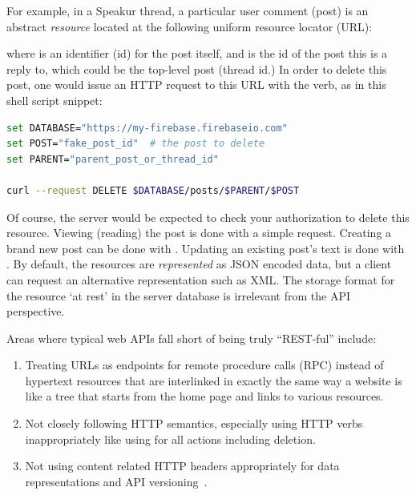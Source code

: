 For example, in a Speakur thread, a particular user comment (post) is an abstract \textit{resource} located at the following uniform resource locator (URL):



where  is an identifier (id) for the post itself, and  is the id of the post this is a reply to, 
which could be the top-level post (thread id.) 
In order to delete this post, one would issue an HTTP request to this URL with the  verb, as in this  shell script snippet:

\begin{lstlisting}[language=bash,numbers=none,caption=
{Deleting a post with the REST API.},label=l:rest_delete,captionpos=below]
set DATABASE="https://my-firebase.firebaseio.com"
set POST="fake_post_id"  # the post to delete
set PARENT="parent_post_or_thread_id"

curl --request DELETE $DATABASE/posts/$PARENT/$POST
\end{lstlisting}

Of course, the server would be expected to check your authorization to delete this resource.
Viewing (reading) the post is done with a simple  request.
Creating a brand new post can be done with .
Updating an existing post's text is done with .
By default, the resources are \textit{represented} as JSON encoded data, 
but a client can request an alternative representation such as XML.
The storage format for the resource `at rest' in the server database is irrelevant from the API perspective.

Areas where typical web APIs fall short of being truly ``REST-ful'' include:
\begin{enumerate}
\item Treating URLs as endpoints for remote procedure calls (RPC) instead of hypertext resources that are interlinked in exactly the same way a website is like a tree that starts from the home page and links to various resources.
\item Not closely following HTTP semantics, especially using HTTP verbs inappropriately like using  for all actions including deletion.
\item Not using content related HTTP headers appropriately for data representations and API versioning~\cite{steveklabnik2011}.
\end{enumerate}

